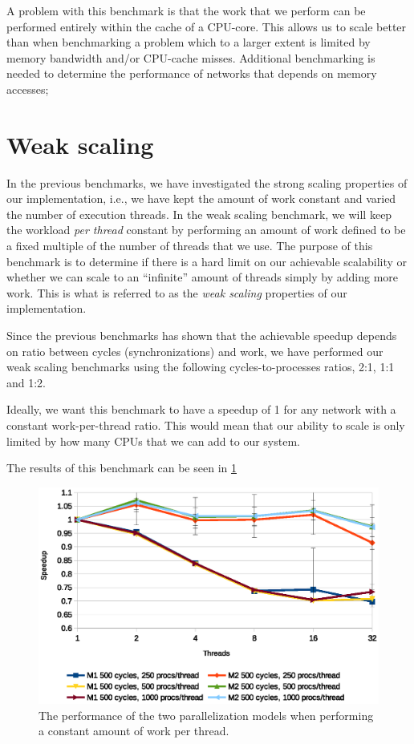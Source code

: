 A problem with this benchmark is that the work that we perform can be
performed entirely within the cache of a CPU-core. This allows us to
scale better than when benchmarking a problem which to a larger extent
is limited by memory bandwidth and/or CPU-cache misses. Additional
benchmarking is needed to determine the performance of networks that
depends on memory accesses;

\section{Weak scaling}
In the previous benchmarks, we have investigated the strong scaling
properties of our implementation, i.e., we have kept the
amount of work constant and varied the number of execution threads. In the
weak scaling benchmark, we will keep the workload \textit{per thread} constant
by performing an amount of work defined to be a fixed multiple of the
number of threads that we use. The purpose of this benchmark is to
determine if there is a hard limit on our achievable scalability or
whether we can scale to an "`infinite"' amount of threads simply by
adding more work. This is what is referred to as the \textit{weak
  scaling} properties\cite{weakscaling} of our implementation.

Since the previous benchmarks has shown that the achievable speedup
depends on ratio between cycles (synchronizations) and work, we have
performed our weak scaling benchmarks using the following
cycles-to-processes ratios, 2:1, 1:1 and 1:2.

Ideally, we want this benchmark to have a speedup of 1 for any network
with a constant work-per-thread ratio. This would mean that our ability
to scale is only limited by how many CPUs that we can add to our
system.

The results of this benchmark can be seen in \cref{fig:weak}

\begin{figure}
\centering
\includegraphics[width=\textwidth]{graphs/weak}
\caption[Weak scaling benchmark]{The performance of the two
  parallelization models when performing a constant amount of work per
thread.}
\label{fig:weak}
\end{figure}

